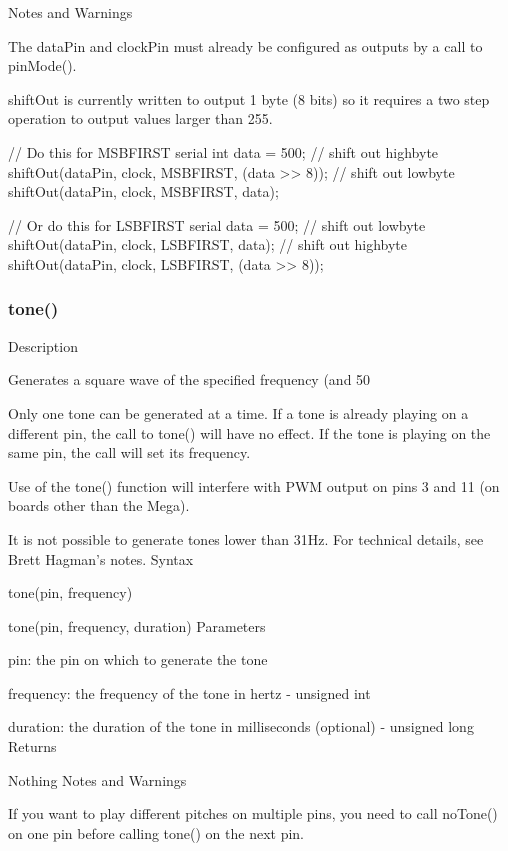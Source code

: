 \documentclass[12pt,a4paper]{report}  %
\begin{document}
Notes and Warnings

The dataPin and clockPin must already be configured as outputs by a call to pinMode().

shiftOut is currently written to output 1 byte (8 bits) so it requires a two step operation to output values larger than 255.

// Do this for MSBFIRST serial
int data = 500;
// shift out highbyte
shiftOut(dataPin, clock, MSBFIRST, (data >> 8));
// shift out lowbyte
shiftOut(dataPin, clock, MSBFIRST, data);

// Or do this for LSBFIRST serial
data = 500;
// shift out lowbyte
shiftOut(dataPin, clock, LSBFIRST, data);
// shift out highbyte
shiftOut(dataPin, clock, LSBFIRST, (data >> 8));

\subsubsection{tone()}\label{tone}


Description

Generates a square wave of the specified frequency (and 50%

Only one tone can be generated at a time. If a tone is already playing on a different pin, the call to tone() will have no effect. If the tone is playing on the same pin, the call will set its frequency.

Use of the tone() function will interfere with PWM output on pins 3 and 11 (on boards other than the Mega).

It is not possible to generate tones lower than 31Hz. For technical details, see Brett Hagman’s notes.
Syntax

tone(pin, frequency)

tone(pin, frequency, duration)
Parameters

pin: the pin on which to generate the tone

frequency: the frequency of the tone in hertz - unsigned int

duration: the duration of the tone in milliseconds (optional) - unsigned long
Returns

Nothing
Notes and Warnings

If you want to play different pitches on multiple pins, you need to call noTone() on one pin before calling tone() on the next pin.
\end{document}
